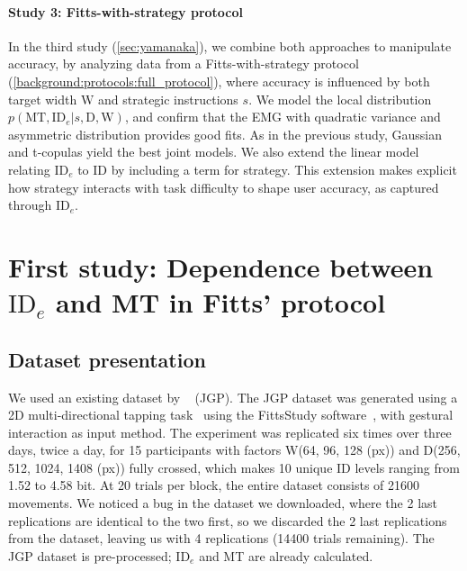 \documentclass[acmlarge, manuscript,review]{acmart}
\newcommand{\mt}{\ensuremath{{\text{MT}}}\xspace}
\newcommand{\ide}{\ensuremath{{\text{ID}_e}}\xspace}
\newcommand{\D}{\ensuremath{{\text{D}}}\xspace}
\newcommand{\W}{\ensuremath{{\text{W}}}\xspace}
\begin{document}
\paragraph*{Study 3: Fitts-with-strategy protocol} 
In the third study (\autoref{sec:yamanaka}), we combine both approaches to manipulate accuracy, by analyzing data from a Fitts-with-strategy protocol (\autoref{background:protocols:full_protocol}), where accuracy is influenced by both target width \W and strategic instructions $s$. 
We model the local distribution $p(\mt, \ide | s, \D, \W)$, and confirm that the EMG with quadratic variance and asymmetric distribution provides good fits. 
As in the previous study, Gaussian and t-copulas yield the best joint models. 
We also extend the linear model relating \ide to ID by including a term for strategy. This extension makes explicit how strategy interacts with task difficulty to shape user accuracy, as captured through \ide.



\section{First study: Dependence between \ide and MT in Fitts' protocol\label{sec:jgp}}

\subsection{Dataset presentation}
We used an existing dataset by \citeauthor{jude2016}~\cite{jude2016} (JGP). The JGP dataset was generated using a 2D multi-directional tapping task~\cite{soukoreff2004} using the FittsStudy software~\cite{wobbrock2011}, with gestural interaction as input method. The experiment was replicated six times over three days, twice a day, for 15 participants with factors \W (64, 96, 128 (px)) and \D (256, 512, 1024, 1408 (px)) fully crossed, which makes 10 unique ID levels ranging from 1.52 to 4.58 bit. At 20 trials per block, the entire dataset consists of 21600 movements.
We noticed a bug in the dataset we downloaded, where the 2 last replications are identical to the two first, so we discarded the 2 last replications from the dataset, leaving us with 4 replications (14400 trials remaining). The JGP dataset is pre-processed; \ide and MT are already calculated. 
\end{document}
